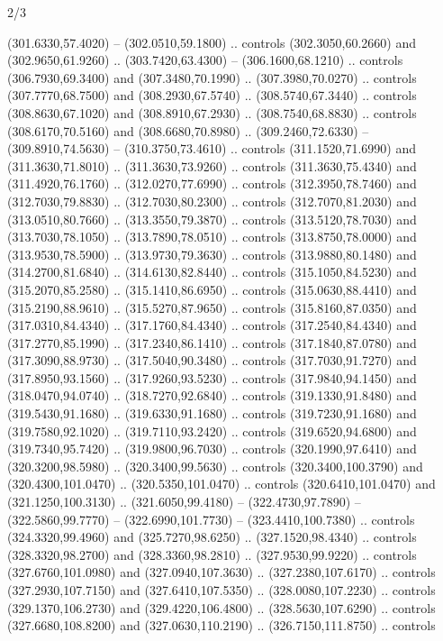 \begin{flagdescription}{2/3}
\begin{scope}[xshift=0.5\flaglength,yshift=0.5\flagwidth,scale=\stretchfactor]
\begin{scope}[scale=0.001645\flagwidth,yshift=65mm,xshift=-63mm]
\begin{scope}[y=0.80pt, x=0.80pt, yscale=-1,]
\begin{scope}[cm={{1.33333,0.0,0.0,1.33333,(0.0,1e-05)}}]
  (301.6330,57.4020) -- (302.0510,59.1800) .. controls (302.3050,60.2660) and
  (302.9650,61.9260) .. (303.7420,63.4300) -- (306.1600,68.1210) .. controls
  (306.7930,69.3400) and (307.3480,70.1990) .. (307.3980,70.0270) .. controls
  (307.7770,68.7500) and (308.2930,67.5740) .. (308.5740,67.3440) .. controls
  (308.8630,67.1020) and (308.8910,67.2930) .. (308.7540,68.8830) .. controls
  (308.6170,70.5160) and (308.6680,70.8980) .. (309.2460,72.6330) --
  (309.8910,74.5630) -- (310.3750,73.4610) .. controls (311.1520,71.6990) and
  (311.3630,71.8010) .. (311.3630,73.9260) .. controls (311.3630,75.4340) and
  (311.4920,76.1760) .. (312.0270,77.6990) .. controls (312.3950,78.7460) and
  (312.7030,79.8830) .. (312.7030,80.2300) .. controls (312.7070,81.2030) and
  (313.0510,80.7660) .. (313.3550,79.3870) .. controls (313.5120,78.7030) and
  (313.7030,78.1050) .. (313.7890,78.0510) .. controls (313.8750,78.0000) and
  (313.9530,78.5900) .. (313.9730,79.3630) .. controls (313.9880,80.1480) and
  (314.2700,81.6840) .. (314.6130,82.8440) .. controls (315.1050,84.5230) and
  (315.2070,85.2580) .. (315.1410,86.6950) .. controls (315.0630,88.4410) and
  (315.2190,88.9610) .. (315.5270,87.9650) .. controls (315.8160,87.0350) and
  (317.0310,84.4340) .. (317.1760,84.4340) .. controls (317.2540,84.4340) and
  (317.2770,85.1990) .. (317.2340,86.1410) .. controls (317.1840,87.0780) and
  (317.3090,88.9730) .. (317.5040,90.3480) .. controls (317.7030,91.7270) and
  (317.8950,93.1560) .. (317.9260,93.5230) .. controls (317.9840,94.1450) and
  (318.0470,94.0740) .. (318.7270,92.6840) .. controls (319.1330,91.8480) and
  (319.5430,91.1680) .. (319.6330,91.1680) .. controls (319.7230,91.1680) and
  (319.7580,92.1020) .. (319.7110,93.2420) .. controls (319.6520,94.6800) and
  (319.7340,95.7420) .. (319.9800,96.7030) .. controls (320.1990,97.6410) and
  (320.3200,98.5980) .. (320.3400,99.5630) .. controls (320.3400,100.3790) and
  (320.4300,101.0470) .. (320.5350,101.0470) .. controls (320.6410,101.0470) and
  (321.1250,100.3130) .. (321.6050,99.4180) -- (322.4730,97.7890) --
  (322.5860,99.7770) -- (322.6990,101.7730) -- (323.4410,100.7380) .. controls
  (324.3320,99.4960) and (325.7270,98.6250) .. (327.1520,98.4340) .. controls
  (328.3320,98.2700) and (328.3360,98.2810) .. (327.9530,99.9220) .. controls
  (327.6760,101.0980) and (327.0940,107.3630) .. (327.2380,107.6170) .. controls
  (327.2930,107.7150) and (327.6410,107.5350) .. (328.0080,107.2230) .. controls
  (329.1370,106.2730) and (329.4220,106.4800) .. (328.5630,107.6290) .. controls
  (327.6680,108.8200) and (327.0630,110.2190) .. (326.7150,111.8750) .. controls

\end{scope}
\end{scope}
\end{scope}
\end{scope}
\end{flagdescription}

